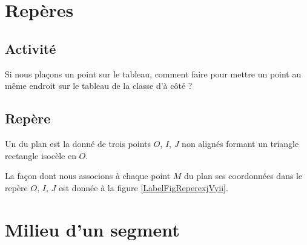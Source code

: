 \section{Repères}

\subsection{Activité}

Si nous plaçons un point sur le tableau, comment faire pour mettre un point au même endroit sur le tableau de la classe d'à côté ?

\subsection{Repère}

\begin{definition}
    Un  du plan est la donné de trois points \( O\), \( I\), \( J\) non alignés formant un triangle rectangle isocèle en  \( O\).
\end{definition}

La façon dont nous associons à chaque point \( M\) du plan ses coordonnées dans le repère \( O\), \( I\), \( J\) est donnée à la figure \ref{LabelFigReperexjVyii}.
\newcommand{\CaptionFigReperexjVyii}{Lire les coordonnées du point \( M\) dans le repère \( OIJ\).}


\section{Milieu d'un segment}

